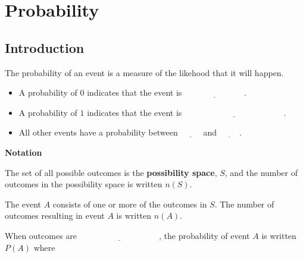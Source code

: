 \newpage
\section{Probability}

\subsection{Introduction}

The probability of an event is  a measure of the likehood that it will happen.

\begin{itemize}
	\setlength\itemsep{0.5em}
	\item A probability of $0$ indicates that the event is $\underline{\hspace{3cm}}$.
	\item A probability of $1$ indicates that the event is $\underline{\hspace{5cm}}$.
	\item All other events have a probability between $\underline{\hspace{1cm}}$ and $\underline{\hspace{1cm}}$.
\end{itemize}

\medskip

\textbf{Notation}

\medskip

The set of all possible outcomes is the \textbf{possibility space}, $S$, and the number of outcomes in the possibility space is written $n(S)$.

\medskip

The event $A$ consists of one or more of the outcomes in $S$. The number of outcomes resulting in event $A$ is written $n(A)$.

\medskip

When outcomes are $\underline{\hspace{4cm}}$, the probability of event $A$ is written $P(A)$ where

\medskip 
\begin{center}
\end{center}


